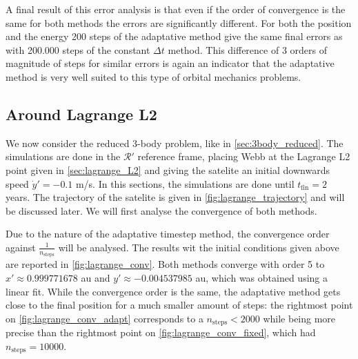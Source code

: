 A final result of this error analysis is that even if the order of convergence is the same for both methods the errors are significantly different. For both the position and the energy 200 steps of the adaptative method give the same final errors as with 200.000 steps of the constant $\Delta t$ method. This difference of 3 orders of magnitude of steps for similar errors is again an indicator that the adaptative method is very well suited to this type of orbital mechanics problems.

\subsection{Around Lagrange L2}

We now consider the reduced 3-body problem, like in \ref{sec:3body_reduced}. The simulations are done in the \(\mathcal R'\) reference frame, placing Webb at the Lagrange L2 point given in \ref{sec:lagrange_L2} and giving the satelite an initial downwards speed \(\dot y' = -0.1\) m/s. In this sections, the simulations are done until \(t_\textrm{fin} = 2\) years. The trajectory of the satelite is given in \autoref{fig:lagrange_trajectory} and will be discussed later. We will first analyse the convergence of both methods.

Due to the nature of the adaptative timestep method, the convergence order against \(\frac{1}{n_\textrm{steps}}\) will be analysed. The results wit the initial conditions given above are reported in \autoref{fig:lagrange_conv}. Both methods converge with order 5 to \(x' \approx 0.999771678\) au and \(y' \approx -0.004537985\) au, which was obtained using a linear fit. While the convergence order is the same, the adaptative method gets close to the final position for a much smaller amount of steps: the rightmost point on \autoref{fig:lagrange_conv_adapt} corresponds to a \(n_\textrm{steps} < 2000\) while being more precise than the rightmost point on \autoref{fig:lagrange_conv_fixed}, which had \(n_\textrm{steps} = 10000\).

